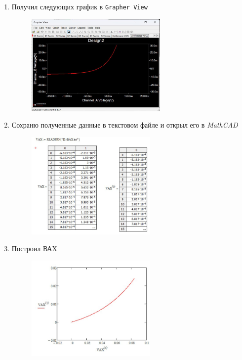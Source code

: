 \begin{enumerate}
\begin{figure}[H]
	\end{figure}
	\item Получил следующих график в \texttt{Grapher View}
	\begin{figure}[H]
		\centering
		\includegraphics[width=0.65\textwidth]{img/18.jpg}
	\end{figure}
	\newpage
	\item Сохраню полученные данные в текстовом файле и открыл его в \textit{MathCAD}
	\begin{figure}[H]
		\centering
		\includegraphics[width=0.6\textwidth]{img/19.jpg}
	\end{figure}
	\item Построил ВАХ
	\begin{figure}[H]
		\centering
		\includegraphics[width=0.6\textwidth]{img/20.jpg}

\end{figure}
\end{enumerate}
